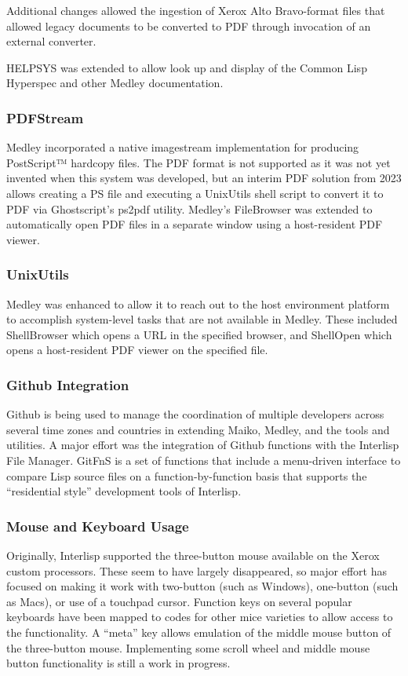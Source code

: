 \documentclass[sigconf]{acmart}
\begin{document}
Additional changes allowed the ingestion of Xerox Alto Bravo-format files that allowed legacy documents to be converted to PDF through invocation of an external converter.

HELPSYS was extended to allow look up and display of the Common Lisp Hyperspec and other Medley documentation.

\subsubsection{PDFStream}
Medley incorporated a native imagestream implementation for producing PostScript™ hardcopy files. The PDF format is not supported as it was not yet invented when this system was developed, but an interim PDF solution from 2023 allows creating a PS file and executing a UnixUtils shell script to convert it to PDF via Ghostscript's ps2pdf utility. Medley's FileBrowser was extended to automatically open PDF files in a separate window using a host-resident PDF viewer.

\subsubsection{UnixUtils}

Medley was enhanced to allow it to reach out to the host environment platform to accomplish system-level tasks that are not available in Medley. These included ShellBrowser which opens a URL in the specified browser, and ShellOpen which opens a host-resident PDF viewer on the specified file.

\subsubsection{Github Integration}

Github is being used to manage the coordination of multiple developers across several time zones and countries in extending Maiko, Medley, and the tools and utilities. A major effort was the integration of Github functions with the Interlisp File Manager. GitFnS is a set of functions that include a menu-driven interface to compare Lisp source files on a function-by-function basis that supports the ``residential style'' development tools of Interlisp.

\subsubsection{Mouse and Keyboard Usage}

Originally, Interlisp supported the three-button mouse available on the Xerox custom processors. These seem to have largely disappeared, so major effort has focused on making it work with two-button (such as Windows), one-button (such as Macs), or use of a touchpad cursor. Function keys on several popular keyboards have been mapped to codes for other mice varieties to allow access to the functionality. A ``meta'' key allows emulation of the middle mouse button of the three-button mouse. Implementing some scroll wheel and middle mouse button functionality is still a work in progress.
\end{document}
